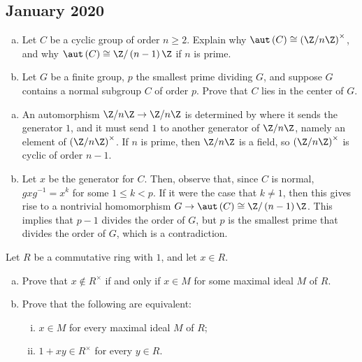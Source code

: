 \documentclass[10pt]{mypackage}
\begin{document}
\subsection{January 2020}%
\begin{problem}[Problem 1]\hfill
  \begin{enumerate}[(a)]
    \item Let $C$ be a cyclic group of order $n\geq 2$. Explain why $\aut\left( C \right)\cong \left( \Z/n\Z \right)^{\times}$, and why $\aut\left( C \right)\cong \Z/\left( n-1 \right)\Z$ if $n$ is prime.
    \item Let $G$ be a finite group, $p$ the smallest prime dividing $G$, and suppose $G$ contains a normal subgroup $C$ of order $p$. Prove that $C$ lies in the center of $G$.
  \end{enumerate}
\end{problem}
\begin{solution}\hfill
  \begin{enumerate}[(a)]
    \item An automorphism $\Z/n\Z\rightarrow \Z/n\Z$ is determined by where it sends the generator $1$, and it must send $1$ to another generator of $\Z/n\Z$, namely an element of $\left( \Z/n\Z \right)^{\times}$. If $n$ is prime, then $\Z/n\Z$ is a field, so $\left( \Z/n\Z \right)^{\times}$ is cyclic of order $n-1$.
    \item Let $x$ be the generator for $C$. Then, observe that, since $C$ is normal, $gxg^{-1} = x^{k}$ for some $1\leq k < p$. If it were the case that $k\neq 1$, then this gives rise to a nontrivial homomorphism $G\rightarrow \aut\left( C \right)\cong \Z/\left( n-1 \right)\Z$. This implies that $p-1$ divides the order of $G$, but $p$ is the smallest prime that divides the order of $G$, which is a contradiction.
  \end{enumerate}
\end{solution}
\begin{problem}[Problem 4]
  Let $R$ be a commutative ring with $1$, and let $x\in R$.
  \begin{enumerate}[(a)]
    \item Prove that $x\notin R^{\times}$ if and only if $x\in M$ for some maximal ideal $M$ of $R$.
    \item Prove that the following are equivalent:
      \begin{enumerate}[(i)]
        \item $x\in M$ for every maximal ideal $M$ of $R$;
        \item $1 + xy\in R^{\times}$ for every $y\in R$.
      \end{enumerate}
  \end{enumerate}
\end{problem}
\end{document}
